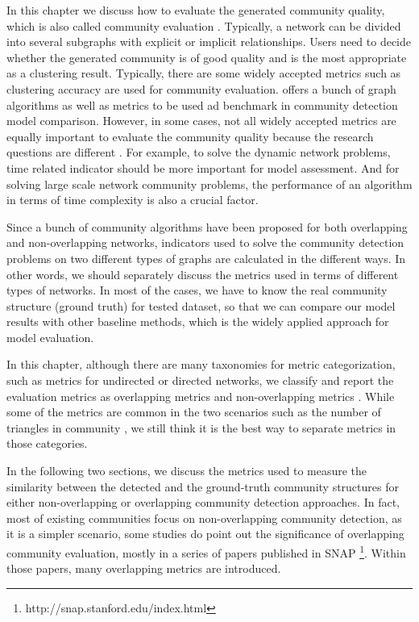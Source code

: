 In this chapter we discuss how to evaluate the generated community quality, which is also called community evaluation \cite{chakraborty2017metrics}. Typically, a network can be divided into several subgraphs with explicit or implicit relationships. Users need to decide whether the generated community is of good quality and is the most appropriate as a clustering result. Typically, there are some widely accepted metrics such as clustering accuracy are used for community evaluation. \cite{lancichinetti2008benchmark} offers a bunch of graph algorithms as well as metrics to be used ad benchmark in community detection model comparison. However, in some cases, not all widely accepted metrics are equally important to evaluate the community quality because  the research questions are different \cite{fortunato2010community}. For example, to solve the dynamic network problems, time related indicator should be more important for model assessment. And for solving large scale network community problems, the performance of an algorithm in terms of time complexity is also a crucial factor.

Since a bunch of community algorithms have been proposed for both overlapping and non-overlapping networks, indicators used to solve the community detection problems on two different  types of graphs are calculated in the different ways.  In other words, we should separately discuss the metrics used in terms of different types of networks. In most of the cases, we have to know the real community structure (ground truth) for tested dataset, so that we can compare our model results with other baseline methods, which is the widely applied approach for model evaluation.  

In this chapter, although there are many taxonomies for metric categorization, such as metrics for undirected or directed networks, we classify and report the evaluation metrics as overlapping metrics and non-overlapping metrics \cite{fortunato2010community,schaeffer2007graph}. While some of the metrics are common in the two scenarios such as the number of triangles in community \cite{leicht2008community,arenas2007size}, we still think it is the best way to separate metrics in those categories.

In the following two sections, we discuss the metrics used to measure the similarity between the detected and the ground-truth community structures for either non-overlapping or overlapping community detection approaches.  In fact, most of existing communities focus on non-overlapping community detection, as it is a simpler scenario, some studies do point out the significance of overlapping community evaluation, mostly in a series of papers published in SNAP \footnote{http://snap.stanford.edu/index.html}. Within those papers, many overlapping metrics are introduced.


